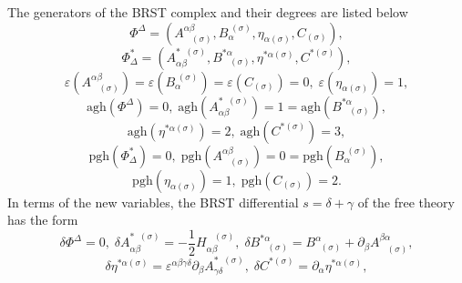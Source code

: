 \documentclass[a4paper,12pt]{article}
\begin{document}
The generators of the BRST complex and their degrees are listed below 
\begin{equation}
\Phi ^{\Delta }=\left( A_{\;\;\;(\sigma )}^{\alpha \beta },B_{\alpha
}^{\;(\sigma )},\eta _{\alpha (\sigma )},C_{(\sigma )}\right) ,
\label{fcola7}
\end{equation}
\begin{equation}
\Phi _{\Delta }^{*}=\left( A_{\alpha \beta }^{*\;\;(\sigma
)},B_{\;\;\;(\sigma )}^{*\alpha },\eta ^{*\alpha (\sigma )},C^{*(\sigma
)}\right) ,  \label{fcola7a}
\end{equation}
\begin{equation}
\varepsilon \left( A_{\;\;\;(\sigma )}^{\alpha \beta }\right) =\varepsilon
\left( B_{\alpha }^{\;(\sigma )}\right) =\varepsilon \left( C_{(\sigma
)}\right) =0,\;\varepsilon \left( \eta _{\alpha (\sigma )}\right) =1,
\label{fcola8}
\end{equation}
\begin{equation}
\mathrm{agh}\left( \Phi ^{\Delta }\right) =0,\;\mathrm{agh}\left( A_{\alpha
\beta }^{*\;\;(\sigma )}\right) =1=\mathrm{agh}\left( B_{\;\;\;(\sigma
)}^{*\alpha }\right) ,  \label{fcola9}
\end{equation}
\begin{equation}
\mathrm{agh}\left( \eta ^{*\alpha (\sigma )}\right) =2,\;\mathrm{agh}\left(
C^{*(\sigma )}\right) =3,  \label{fcola10}
\end{equation}
\begin{equation}
\mathrm{pgh}\left( \Phi _{\Delta }^{*}\right) =0,\;\mathrm{pgh}\left(
A_{\;\;\;(\sigma )}^{\alpha \beta }\right) =0=\mathrm{pgh}\left( B_{\alpha
}^{\;(\sigma )}\right) ,  \label{fcola11}
\end{equation}
\begin{equation}
\mathrm{pgh}\left( \eta _{\alpha (\sigma )}\right) =1,\;\mathrm{pgh}\left(
C_{(\sigma )}\right) =2.  \label{fcola12}
\end{equation}
In terms of the new variables, the BRST differential $s=\delta +\gamma $ of
the free theory has the form 
\begin{equation}
\delta \Phi ^{\Delta }=0,\;\delta A_{\alpha \beta }^{*\;\;(\sigma )}=-\frac{1%
}{2}H_{\alpha \beta }^{\;\;\;(\sigma )},\;\delta B_{\;\;\;(\sigma
)}^{*\alpha }=B_{\;\;(\sigma )}^{\alpha }+\partial _{\beta }A_{\;\;\;(\sigma
)}^{\beta \alpha },  \label{fcola13}
\end{equation}
\begin{equation}
\delta \eta ^{*\alpha (\sigma )}=\varepsilon ^{\alpha \beta \gamma \delta
}\partial _{\beta }A_{\gamma \delta }^{*\;\;(\sigma )},\;\delta C^{*(\sigma
)}=\partial _{\alpha }\eta ^{*\alpha (\sigma )},  \label{fcola14}
\end{equation}
\end{document}
